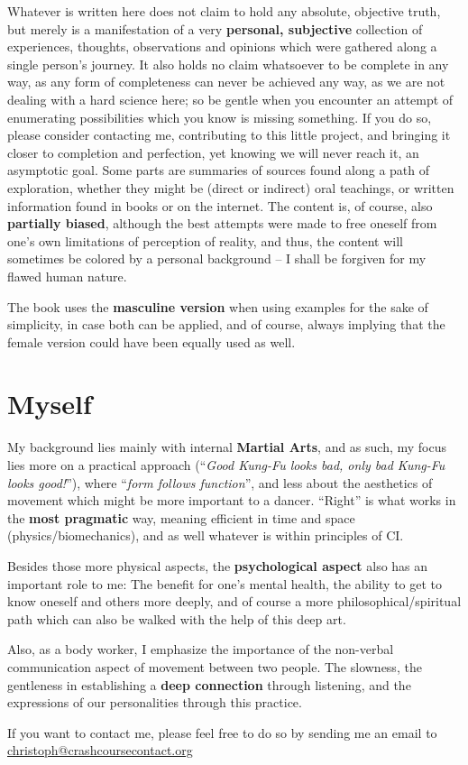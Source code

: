 Whatever is written here does not claim to hold any absolute, objective truth, but merely is a manifestation of a very \textbf{personal, subjective} collection of experiences, thoughts, observations and opinions which were gathered along a single person's journey.
It also holds no claim whatsoever to be complete in any way, as any form of completeness can never be achieved any way, as we are not dealing with a hard science here; so be gentle when you encounter an attempt of enumerating possibilities which you know is missing something.
If you do so, please consider contacting me, contributing to this little project, and bringing it closer to completion and perfection, yet knowing we will never reach it, an asymptotic goal.
Some parts are summaries of sources found along a path of exploration, whether they might be (direct or indirect) oral teachings, or written information found in books or on the internet.
The content is, of course, also \textbf{partially biased}, although the best attempts were made to free oneself from one's own limitations of perception of reality, and thus, the content will sometimes be colored by a personal background -- I shall be forgiven for my flawed human nature.

The book uses the \textbf{masculine version} when using examples for the sake of simplicity, in case both can be applied, and of course, always implying that the female version could have been equally used as well.

\section{Myself}\label{sec:myself}

My background lies mainly with internal \textbf{Martial Arts}, and as such, my focus lies more on a practical approach (``\textit{Good Kung-Fu looks bad, only bad Kung-Fu looks good!}''), where ``\textit{form follows function}'', and less about the aesthetics of movement which might be more important to a dancer.
``Right'' is what works in the \textbf{most pragmatic} way, meaning efficient in time and space (physics/biomechanics), and as well whatever is within principles of CI.

Besides those more physical aspects, the \textbf{psychological aspect} also has an important role to me: The benefit for one's mental health, the ability to get to know oneself and others more deeply, and of course a more philosophical/spiritual path which can also be walked with the help of this deep art.

Also, as a body worker, I emphasize the importance of the non-verbal communication aspect of movement between two people.
The slowness, the gentleness in establishing a \textbf{deep connection} through listening, and the expressions of our personalities through this practice.

If you want to contact me, please feel free to do so by sending me an email to \href{mailto:christoph@crashcoursecontact.org}{christoph@crashcoursecontact.org}
